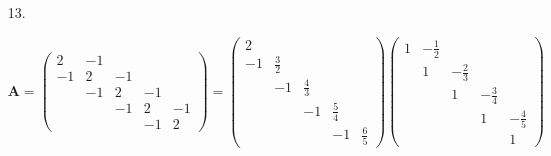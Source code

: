 \documentclass{sjtuarticle}
\begin{document}
\begin{itemize}
\begin{proof}
\begin{itemize}
            综上，$\bm{A}^{-1}$ 是对称正定的。
            \item[(2)] 由于 $\bm{A}$ 是对称正定的，所以 $\bm{A}^{-1}$ 也是对称正定的（上一小问的结论），存在它的 Cholesky 分解，使得 $L^*$ 对角线上的元素都是正的且唯一：
            \begin{equation*}
                \bm{A}^{-1}=\bm{L}^*{\bm{L}^*}^\top
            \end{equation*}
            则
            \begin{equation*}
                \bm{A}=(\bm{A}^{-1})^{-1}=(\bm{L}^*{\bm{L}^*}^\top)^{-1}=({\bm{L}^*}^\top)^{-1}{\bm{L}^*}^{-1}=({\bm{L}^*}^{-1})^\top{\bm{L}^*}^{-1}
            \end{equation*}
            其中 ${\bm{L}^*}^{-1}$ 的对角线元素均正（根据矩阵乘法，$a_{ii}a_{ii}^*=1$，$a_{ii}>0, a_{ii}^*=\frac{1}{a_{ii}}>0$）。
        \end{itemize}
    \end{proof}
    \item[13.] \begin{solution}
        \begin{equation*}
            \bm{A}=\begin{pmatrix}
                2 & -1 \\
                -1 & 2 & -1 \\
                & -1 & 2 & -1 \\
                &  & -1 & 2 & -1 \\
                &  &   &  -1 & 2
            \end{pmatrix}=\begin{pmatrix}
                2 \\
                -1 & \frac{3}{2} \\
                   & -1 & \frac{4}{3} \\
                   &    &    -1 & \frac{5}{4} \\
                   &    &             & -1 & \frac{6}{5}
            \end{pmatrix}\begin{pmatrix}
                1 & -\frac{1}{2} \\
                  &  1 & -\frac{2}{3} \\
                  &    &  1  & -\frac{3}{4} \\
                  &    &     &   1   & -\frac{4}{5} \\
                  &    &     &       &    1
            \end{pmatrix}

\end{equation*}
\end{solution}
\end{itemize}
\end{document}
